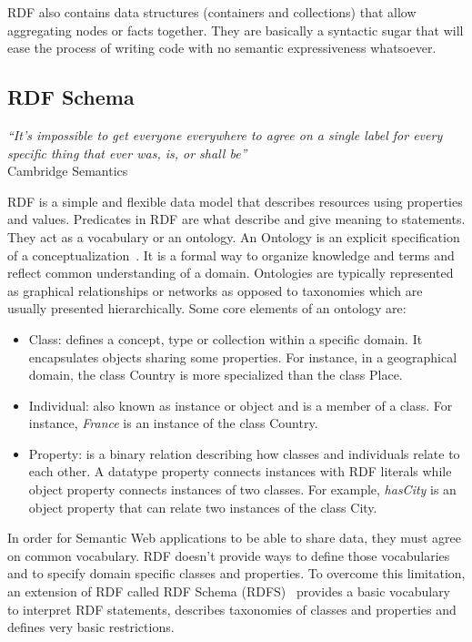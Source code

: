 RDF also contains data structures (containers and collections) that allow aggregating nodes or facts together. They are basically a syntactic sugar that will ease the process of writing code with no semantic expressiveness whatsoever.

\subsection{RDF Schema}

\begin{flushright}
	\textit{``It's impossible to get everyone everywhere to agree on a single label for every specific thing that ever was, is, or shall be''}\\
	Cambridge Semantics~\cite{Cambridge:RDF-101:13}
\end{flushright}

RDF is a simple and flexible data model that describes resources using properties and values. Predicates in RDF are what describe and give meaning to statements. They act as a vocabulary or an ontology. An Ontology is an explicit specification of a conceptualization~\cite{Gruber:KA:93}. It is a formal way to organize knowledge and terms and reflect common understanding of a domain. Ontologies are typically represented as graphical relationships or networks as opposed to taxonomies which are usually presented hierarchically. Some core elements of an ontology are:

\begin{itemize}
	\item Class: defines a concept, type or collection within a specific domain. It encapsulates objects sharing some properties. For instance, in a geographical domain, the class Country is more specialized than the class Place.
	\item Individual: also known as instance or object and is a member of a class. For instance, \emph{France} is an instance of the class Country.
	\item Property: is a binary relation describing how classes and individuals relate to each other. A datatype property connects instances with RDF literals while object property connects instances of two classes. For example, \emph{hasCity} is an object property that can relate two instances of the class City.
\end{itemize}

In order for Semantic Web applications to be able to share data, they must agree on common vocabulary. RDF doesn't provide ways to define those vocabularies and to specify domain specific classes and properties. To overcome this limitation, an extension of RDF called RDF Schema (RDFS)~\cite{Brickley:RDFS:14} provides a basic vocabulary to interpret RDF statements, describes taxonomies of classes and properties and defines very basic restrictions.

